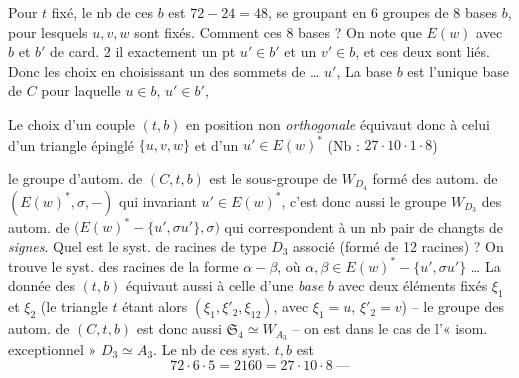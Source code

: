 \documentclass[11pt,a4paper]{article}
\begin{document}

Pour $t$ fixé, le nb de ces $b$ est $72 - 24 = 48$, se groupant en 6
groupes de 8 bases $b$, pour lesquels $u, v, w$ sont fixés. Comment
  ces 8 bases ? On note que
$E(w)$ avec $b$ et $b'$ \ill{} de card. 2 il 
exactement un pt $u' \in b'$ et un $v' \in b$, et ces deux sont liés. Donc
les \struck{\ill{}} choix  en choisissant
 un des 
sommets de   
\ldots{}  $u'$, La base $b$ est l'unique base de $C$
pour laquelle $u \in b$, $u' \in b'$,

Le choix d'un couple $(t, b)$ \struck{\ill{}} en position non
\emph{orthogonale} équivaut donc à celui d'un triangle épinglé
$\lbrace u, v, w \rbrace$ et d'un $u' \in E(w)^{*}$
\quad (Nb : $27 \cdot 10 \cdot 1 \cdot 8$)


le groupe d'autom. de $(C, t, b)$ est le sous-groupe de $W_{D_4}$ formé des
autom. de $(E(w)^{*}, \sigma, -)$ qui invariant $u' \in E(w)^{*}$, c'est
donc aussi le groupe $W_{D_3}$ des autom. de
$\bigl(E(w)^{*} - \lbrace u', \sigma u' \rbrace, \sigma\bigr)$ qui
correspondent à un nb pair de changts de \emph{signes}. Quel est le syst. de
racines de type $D_3$ associé (formé de 12 racines) ? On trouve
\struck{\ill{} \ill{}} le syst. des racines de la forme $\alpha - \beta$,
où $\alpha, \beta \in E(w)^{*} - \lbrace u', \sigma u' \rbrace$ \ldots{}
\struck{\ill{}}  La donnée des $(t, b)$
équivaut aussi à celle d'une \emph{base} $b$ avec deux éléments fixés
$\xi_1$ et $\xi_2$ (le triangle $t$ étant alors
$(\xi_1, \xi'_2, \xi_{12})$, avec $\xi_1 = u$, $\xi'_2 = v$) -- le groupe
des autom. de $(C, t, b)$ est donc aussi $\mathfrak{S}_4 \simeq W_{A_3}$
-- on est dans le cas de l'« isom. exceptionnel » $D_3 \simeq A_3$. Le nb de
ces syst. $t, b$ est
\[
72 \cdot 6 \cdot 5 = 2160 = 27 \cdot 10 \cdot 8 \ \text{---}
\]
\end{document}
